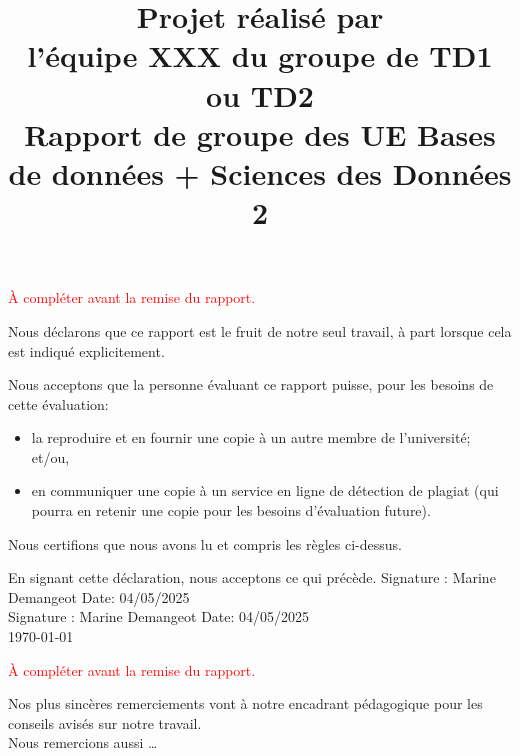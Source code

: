 \documentclass[mstat,12pt]{unswthesis}
\title{Projet réalisé par\\[0.5cm] l'équipe XXX du groupe de TD1 ou
TD2 \\[3cm]Rapport de groupe des UE \newline  Bases de données +
Sciences des Données 2}
\author{\Authornameonly}
\begin{document}
\beforepreface




\textcolor{red}{À compléter avant la remise du rapport.}

\vskip 2pc \noindent Nous déclarons que ce rapport est le fruit de notre seul travail, à part lorsque cela est indiqué  explicitement. 

\vskip 2pc  \noindent Nous acceptons que la personne évaluant ce rapport puisse, pour les besoins de cette évaluation:
\begin{itemize}
\item la reproduire et en fournir une copie à un autre membre de l'université; et/ou,
\item en communiquer une copie à un service en ligne de détection de plagiat (qui pourra en retenir une copie pour les besoins d'évaluation future).
\end{itemize}

\vskip 2pc \noindent Nous certifions que nous avons lu et compris les règles ci-dessus.\vspace{24pt}

\vskip 2pc \noindent En signant cette déclaration, nous acceptons ce qui précède.
\vskip 2pc \noindent
Signature : Marine Demangeot \hfill Date: 04/05/2025\\[1cm]
Signature : Marine Demangeot \hfill Date: 04/05/2025 \\[1cm]


{\bigskip\bigskip\bigskip\noindent} \today




\textcolor{red}{À compléter avant la remise du rapport.}

{\bigskip}Nos plus sincères remerciements vont à notre encadrant
pédagogique pour les conseils avisés sur notre travail.\\[1cm] Nous
remercions aussi \ldots{}\\[1cm] 
\end{document}
